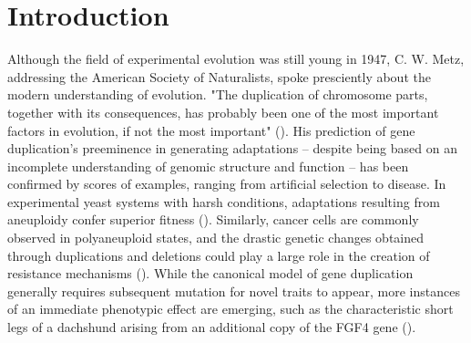 \section{Introduction} \label{sec:introduction}

Although the field of experimental evolution was still young in 1947, C. W. Metz, addressing the American Society of Naturalists, spoke presciently about the modern understanding of evolution. "The duplication of chromosome parts, together with its consequences, has probably been one of the most important factors in evolution, if not the most important" (\citep{Metz:chromosomeDuplication1947}). His prediction of gene duplication's preeminence in generating adaptations -- despite being based on an incomplete understanding of genomic structure and function -- has been confirmed by scores of examples, ranging from artificial selection to disease. In experimental yeast systems with harsh conditions, adaptations resulting from aneuploidy confer superior fitness (\citep{Pavelka:2010}). Similarly, cancer cells are commonly observed in polyaneuploid states, and the drastic genetic changes obtained through duplications and deletions could play a large role in the creation of resistance mechanisms (\citep{polyaneuploidCancer}). While the canonical model of gene duplication generally requires subsequent mutation for novel traits to appear, more instances of an immediate phenotypic effect are emerging, such as the characteristic short legs of a dachshund arising from an additional copy of the FGF4 gene (\citep{ohno1970evolution,dachshundGeneCopyNum}).



